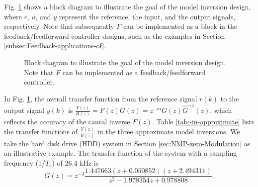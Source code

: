 \documentclass [11pt, proquest] {uwthesis}[2020/02/24]
\begin{document}
Fig. \ref{fig:Block-diagram-for-1} shows a block diagram to illustrate
the goal of the model inversion design, where $r$, $u$, and $y$
represent the reference, the input, and the output signals, respectively.
Note that subsequently $F$ can be implemented as a block in the feedback/feedforward
controller designs, such as the examples in Section \ref{subsec:Feedback-applications-of}.
\begin{figure}[!ht]
\begin{centering}
\par\end{centering}
\caption{\label{fig:Block-diagram-for-1}Block diagram to illustrate the goal
of the model inversion design. Note that $F$ can be implemented as
a feedback/feedforward controller. }
\end{figure}
 In Fig. \ref{fig:Block-diagram-for-1}, the overall transfer function
from the reference signal $r(k)$ to the output signal $y(k)$ is
$\frac{Y(z)}{R(z)}=F(z)G(z)=z^{-m}G(z)\hat{G}^{-1}(z)$, which reflects
the accuracy of the causal inverse $F(z)$. Table \ref{tab:-in-approximate}
lists the transfer functions of $\frac{Y(z)}{R(z)}$ in the three
approximate model inversions. We take the hard disk drive (HDD) system
in Section \ref{sec:NMP-zero-Modulation} as an illustrative example.
The transfer function of the system with a sampling frequency (1/$T_{s}$)
of 26.4 kHz is
\begin{equation}
G(z)=z^{-3}\frac{1.447663(z+0.050852)(z+2.494311)}{z^{2}-1.978354z+0.978808}.\label{eq:Pd}
\end{equation}
\end{document}
